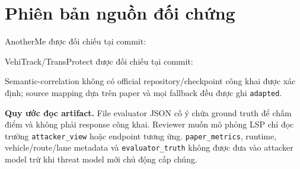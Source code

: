 \documentclass[12pt,a4paper,oneside]{report}
\begin{document}
\section{Phiên bản nguồn đối chứng}

AnotherMe được đối chiếu tại commit:

\noindent\small{}\normalsize

VehiTrack/TransProtect được đối chiếu tại commit:

\noindent\small{}\normalsize

Semantic-correlation không có official repository/checkpoint công khai được xác định; source mapping dựa trên paper và mọi fallback đều được ghi \texttt{adapted}.

\noindent\textbf{Quy ước đọc artifact.} File evaluator JSON cố ý chứa ground truth để chấm điểm và không phải response công khai. Reviewer muốn mô phỏng LSP chỉ đọc trường \texttt{attacker\_view} hoặc endpoint tương ứng. \texttt{paper\_metrics}, runtime, vehicle/route/lane metadata và \texttt{evaluator\_truth} không được đưa vào attacker model trừ khi threat model mới chủ động cấp chúng.
\end{document}
